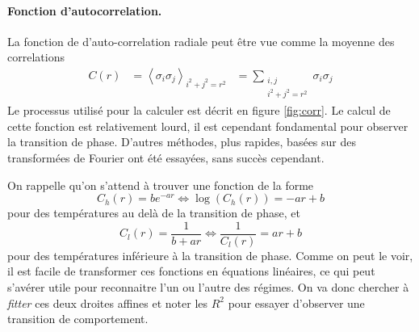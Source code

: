 \documentclass[a4paper, 11pt]{article}
\begin{document}
\paragraph{Fonction d'autocorrelation.} La fonction de d'auto-correlation radiale peut être vue
comme la moyenne des correlations 
\begin{equation}
    \begin{aligned}
        C(r) &= \left< \sigma_i \sigma_j\right>_{i^2+j^2=r^2} 
        &= \sum_{\substack{i, j \\ i^2+j^2=r^2}} \sigma_i \sigma_j
    \end{aligned}
\end{equation}
Le processus utilisé pour la calculer est décrit en figure \ref{fig:corr}. Le calcul de cette
fonction est relativement lourd, il est cependant fondamental pour observer la transition de phase.
D'autres méthodes, plus rapides, basées sur des transformées de Fourier ont été essayées, sans
succès cependant.

On rappelle qu'on s'attend à trouver une fonction de la forme 
\begin{equation}
    C_h(r) = b e^{-ar} \iff \log(C_h(r)) = -a r + b
\end{equation}
pour des températures au delà de la transition de phase, et 
\begin{equation}
    C_l(r) = \frac{1}{b+ar} \iff \frac{1}{C_l(r)}  = a r + b  
\end{equation}
pour des températures inférieure à la transition de phase. Comme on peut le voir, il est facile de
transformer ces fonctions en équations linéaires, ce qui peut s'avérer utile pour reconnaitre l'un
ou l'autre des régimes. On va donc chercher à \emph{fitter} ces deux droites affines et noter les
$R^2$ pour essayer d'observer une transition de comportement.
\end{document}
